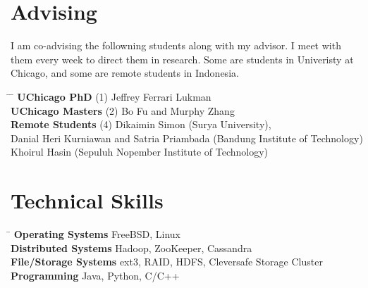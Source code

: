 \documentclass[10pt]{article} %
\begin{document}

\section{Advising}

I am co-advising the followning students along with my advisor. I meet with them
every week to direct them in research. Some are students in Univeristy at
Chicago, and some are remote students in Indonesia.
\begin{tabbing}
\hspace{4cm} \= \hspace{1cm} \= \kill
\textbf{UChicago PhD} \> (1) \> Jeffrey Ferrari Lukman\\
\textbf{UChicago Masters} \> (2) \> Bo Fu and Murphy Zhang\\
\textbf{Remote Students} \> (4) \> Dikaimin Simon (Surya University),\\
\> \>Danial Heri Kurniawan and Satria Priambada (Bandung Institute of Technology)\\
\> \>Khoirul Hasin (Sepuluh Nopember Institute of Technology)
\end{tabbing}



\section{Technical Skills}

\begin{tabbing}
\hspace{4cm} \= \kill
\textbf{Operating Systems} \> FreeBSD, Linux \\
\textbf{Distributed Systems} \> Hadoop, ZooKeeper, Cassandra \\
\textbf{File/Storage Systems} \> ext3, RAID, HDFS, Cleversafe Storage Cluster\\
\textbf{Programming} \> Java, Python, C/C++
\end{tabbing}
\end{document}
